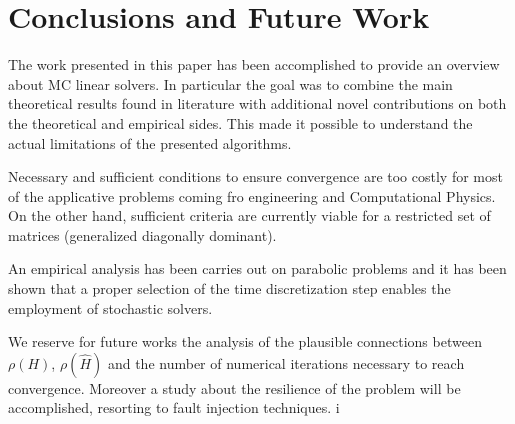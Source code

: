 \section{Conclusions and Future Work}
\label{sec:conclusion}

The work presented in this paper has been accomplished to provide an overview
about MC linear solvers. In particular the goal was to combine the main
theoretical results found in literature with additional novel contributions on
both the theoretical and empirical sides. This made it possible to understand
the actual limitations of the presented algorithms.

Necessary and sufficient conditions to ensure convergence are too costly for
most of the applicative problems coming fro engineering and Computational
Physics. On the other hand, sufficient criteria are currently viable for a
restricted set of matrices (generalized diagonally dominant).

An empirical analysis has been carries out on parabolic problems and it has
been shown that a proper selection of the time discretization step enables the
employment of stochastic solvers.

We reserve for future works the analysis of the plausible connections between
$\rho(H)$, $\rho(\hat{H})$ and the number of numerical iterations necessary to
reach convergence. Moreover a study about the resilience of the problem will be
accomplished, resorting to fault injection techniques.
i
